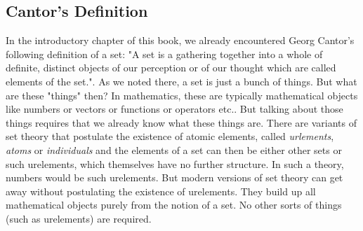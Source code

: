 
\subsection{Cantor's Definition}
In the introductory chapter of this book, we already encountered Georg Cantor's following definition of a set: "A set is a gathering together into a whole of definite, distinct objects of our perception or of our thought which are called elements of the set.". As we noted there, a set is just a bunch of things. But what are these "things" then? In mathematics, these are typically mathematical objects like numbers or vectors or functions or operators etc.. But talking about those things requires that we already know what these things are. There are variants of set theory that postulate the existence of atomic elements, called \emph{urlements}, \emph{atoms} or \emph{individuals} and the elements of a set can then be either other sets or such urelements, which themselves have no further structure. In such a theory, numbers would be such urelements. But modern versions of set theory can get away without postulating the existence of urelements. They build up all mathematical objects purely from the notion of a set. No other sorts of things (such as urelements) are required. 






